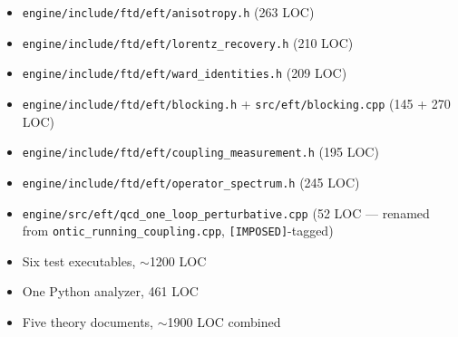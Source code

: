 \documentclass[11pt,letterpaper]{article}
\begin{document}
\begin{itemize}
  \item \texttt{engine/include/ftd/eft/anisotropy.h} (263 LOC)
  \item \texttt{engine/include/ftd/eft/lorentz\_recovery.h} (210 LOC)
  \item \texttt{engine/include/ftd/eft/ward\_identities.h} (209 LOC)
  \item \texttt{engine/include/ftd/eft/blocking.h} + \texttt{src/eft/blocking.cpp} (145 + 270 LOC)
  \item \texttt{engine/include/ftd/eft/coupling\_measurement.h} (195 LOC)
  \item \texttt{engine/include/ftd/eft/operator\_spectrum.h} (245 LOC)
  \item \texttt{engine/src/eft/qcd\_one\_loop\_perturbative.cpp} (52 LOC --- renamed from \texttt{ontic\_running\_coupling.cpp}, \texttt{[IMPOSED]}-tagged)
  \item Six test executables, $\sim$1200 LOC
  \item One Python analyzer, 461 LOC
  \item Five theory documents, $\sim$1900 LOC combined
\end{itemize}
\end{document}
